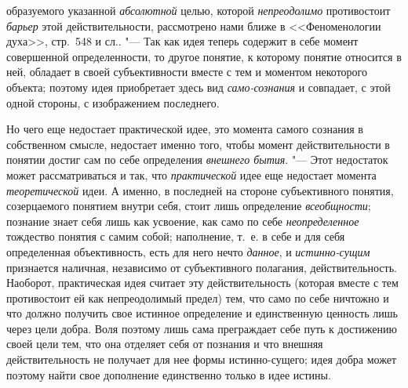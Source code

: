 образуемого указанной {\em абсолютной}
целью, которой
{\em непреодолимо}
противостоит {\em барьер}
этой действительности, рассмотрено нами ближе в
<<Феноменологии духа>>, стр.~548 и
сл..
"--- Так как идея теперь содержит в себе момент совершенной
определенности, то другое понятие, к которому понятие относится в ней,
обладает в своей субъективности вместе с тем и моментом некоторого объекта;
поэтому идея приобретает здесь вид
{\em само-сознания}
и совпадает, с этой одной стороны, с изображением
последнего.

Но чего еще недостает практической идее, это момента самого
сознания в собственном
смысле,
недостает именно того, чтобы момент действительности в
понятии достиг сам по себе определения
{\em внешнего бытия}. "---
Этот недостаток может рассматриваться и так, что
{\em практической} идее
еще недостает момента
{\em теоретической} идеи.
А именно, в последней на стороне субъективного понятия, созерцаемого
понятием внутри себя, стоит лишь определение
{\em всеобщности};
познание знает себя лишь как усвоение, как само по себе
{\em неопределенное}
тождество понятия с самим собой; наполнение, т.~е. в себе и
для себя определенная объективность, есть для него нечто
{\em данное}, и
{\em истинно-сущим}
признается наличная, независимо от субъективного полагания,
действительность. Наоборот, практическая идея считает эту действительность
(которая вместе с тем противостоит ей как непреодолимый предел) тем, что
само по себе ничтожно и что должно получить свое истинное определение и
единственную ценность лишь через цели добра. Воля поэтому лишь сама
преграждает себе путь к достижению своей цели тем, что она отделяет себя от
познания и что внешняя действительность не получает для нее формы
истинно-сущего; идея добра может поэтому найти свое дополнение единственно
только в идее истины.

